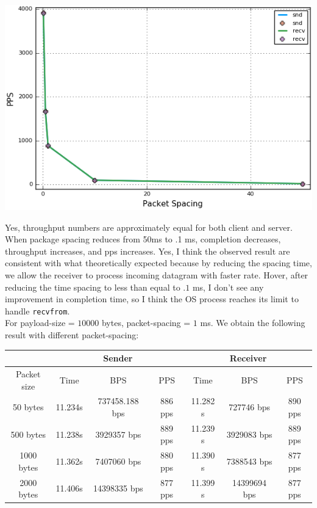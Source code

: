 \documentclass[12pt]{article}
\newenvironment{problem}[2][Problem]{\begin{trivlist}
\item[\hskip \labelsep {\bfseries #1}\hskip \labelsep {\bfseries #2.}]}{\end{trivlist}}
\begin{document}
\begin{problem}{2}
\begin{center}
\includegraphics[scale=.6]{5.png}	
\end{center}
Yes, throughput numbers are approximately equal for both client and server. When package spacing reduces from 50ms to .1 ms, completion decreases, throughput increases, and pps increases. Yes, I think the observed result are consistent with what theoretically expected because by reducing the spacing time, we allow the receiver to process incoming datagram with faster rate. Hover, after reducing the time spacing to less than equal to $.1$ ms, I don't see any improvement in completion time, so I think the OS process reaches its limit to handle \texttt{recvfrom}.\\
For payload-size = $10000$ bytes, packet-spacing = $1$ ms. We obtain the following result with different packet-spacing:\\
\begin{center}
	\begin{tabular}{|c|c|c|c|c|c|c|}
	\hline 
	& \multicolumn{3}{|c|}{Sender} & \multicolumn{3}{|c|}{Receiver}\\ \hline
	Packet size 		   	   & Time& BPS& PPS& Time &BPS& PPS\\ \hline
	50 bytes 		  		   & 11.234s &  737458.188 bps& 886 pps & 11.282 s &727746 bps& 890 pps\\ \hline
	500 bytes 		  		   & 11.238s &  3929357 bps& 889 pps & 11.239 s & 3929083 bps & 889 pps\\ \hline
	1000 bytes 		  		   & 11.362s &  7407060 bps& 880 pps & 11.390 s &7388543 bps  & 877 pps\\ \hline
	2000 bytes 		  		   & 11.406s &  14398335 bps& 877 pps & 11.399 s &14399694 bps& 877 pps\\ \hline

\end{tabular}
\end{center}
\end{problem}
\end{document}
